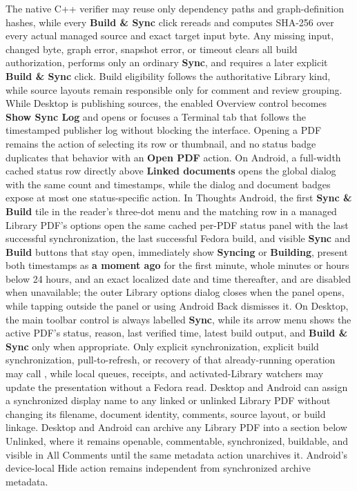 {The native C++ verifier may reuse only dependency paths and graph-definition hashes, while every \textbf{Build \& Sync} click rereads and computes SHA-256 over every actual managed source and exact target input byte.
Any missing input, changed byte, graph error, snapshot error, or timeout clears all build authorization, performs only an ordinary \textbf{Sync}, and requires a later explicit \textbf{Build \& Sync} click.
Build eligibility follows the authoritative Library kind, while source layouts remain responsible only for comment and review grouping.
While Desktop is publishing sources, the enabled Overview control becomes \textbf{Show Sync Log} and opens or focuses a Terminal tab that follows the timestamped publisher log without blocking the interface.
Opening a PDF remains the action of selecting its row or thumbnail, and no status badge duplicates that behavior with an \textbf{Open PDF} action.
On Android, a full-width cached status row directly above \textbf{Linked documents} opens the global dialog with the same count and timestamps, while the dialog and document badges expose at most one status-specific action.
In Thoughts Android, the first \textbf{Sync \& Build} tile in the reader's three-dot menu and the matching row in a managed Library PDF's options open the same cached per-PDF status panel with the last successful synchronization, the last successful Fedora build, and visible \textbf{Sync} and \textbf{Build} buttons that stay open, immediately show \textbf{Syncing} or \textbf{Building}, present both timestamps as \textbf{a moment ago} for the first minute, whole minutes or hours below 24 hours, and an exact localized date and time thereafter, and are disabled when unavailable; the outer Library options dialog closes when the panel opens, while tapping outside the panel or using Android Back dismisses it.
On Desktop, the main toolbar control is always labelled \textbf{Sync}, while its arrow menu shows the active PDF's status, reason, last verified time, latest build output, and \textbf{Build \& Sync} only when appropriate.
Only explicit synchronization, explicit build synchronization, pull-to-refresh, or recovery of that already-running operation may call , while local queues, receipts, and activated-Library watchers may update the presentation without a Fedora read.
Desktop and Android can assign a synchronized display name to any linked or unlinked Library PDF without changing its filename, document identity, comments, source layout, or build linkage.
Desktop and Android can archive any Library PDF into a section below Unlinked, where it remains openable, commentable, synchronized, buildable, and visible in All Comments until the same metadata action unarchives it.
Android's device-local Hide action remains independent from synchronized archive metadata.}

